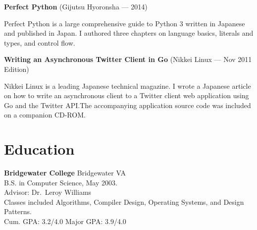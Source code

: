 \documentclass{article}
\begin{document}
\begin{list}{}{
    \setlength{\leftmargin}{0cm}	%
    \setlength{\parsep}{0.15cm}
}
    \item \textbf{\large Perfect Python} (Gijutsu Hyoronsha --- 2014)

        Perfect Python is a large comprehensive guide to Python 3 written in
        Japanese and published in Japan. I authored three chapters on language
        basics, literals and types, and control flow.

    \item \textbf{\large Writing an Asynchronous Twitter Client in Go} (Nikkei Linux --- Nov 2011 Edition)

        Nikkei Linux is a leading Japanese technical magazine. I wrote a
        Japanese article on how to write an asynchronous client to a Twitter
        client web application using Go and the Twitter API.\@ The accompanying
        application source code was included on a companion CD-ROM.\@
\end{list}

\section{Education}

\begin{list}{}{
    \setlength{\leftmargin}{0cm}	%
    \setlength{\parsep}{0.15cm}
}
    \item \textbf{Bridgewater College} Bridgewater VA\\
        B.S. in Computer Science, May 2003.\\
        Advisor: Dr.\ Leroy Williams\\
        Classes included Algorithms, Compiler Design, Operating Systems, and
        Design Patterns.\\
        Cum. GPA\@: 3.2/4.0 Major GPA\@: 3.9/4.0
\end{list}
\end{document}
